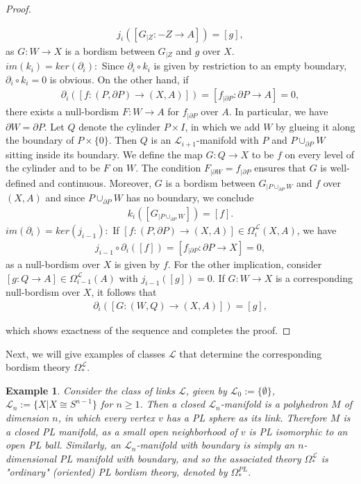 \documentclass[11pt]{book}
\newtheorem{example}{Example}
\begin{document}
\begin{proof}
\begin{itemize}
\begin{align*}
j_i([G_{|Z}: -Z \to A]) = [g],
\end{align*}
as $G: W \to X$ is a bordism between $G_{|Z}$ and $g$ over $X$. \\
$im(k_i)=ker(\partial_i):$ Since $\partial_i \circ k_i$ is given by restriction to an empty boundary, $\partial_i \circ k_i=0$ is obvious. On the other hand, if 
\begin{align*}
\partial_i([f:(P, \partial P) \to (X,A)])= [f_{| \partial P} : \partial P \to A] = 0,
\end{align*}
there exists a null-bordism $F: W \to A$ for $f_{| \partial P}$ over $A$. In particular, we have $\partial W= \partial P$. Let $Q$ denote the cylinder $P \times I$, in which we add $W$ by glueing it along the boundary of $P \times \{ 0 \}$. Then $Q$ is an $\mathcal{L}_{i+1}$-manifold with $P$ and $P \cup_{\partial P} W$ sitting inside its boundary. We define the map $G: Q \to X$ to be $f$ on every level of the cylinder and to be $F$ on $W$. The condition $F_{| \partial W}=f_{| \partial P}$ ensures that $G$ is well-defined and continuous. Moreover, $G$ is a bordism between $G_{|P \cup_{\partial P} W}$ and $f$ over $(X,A)$ and since $P \cup_{\partial P} W$ has no boundary, we conclude 
\begin{align*}
k_i([G_{|P \cup_{\partial P} W}])=[f].
\end{align*}
$im(\partial_i)= ker(j_{i-1}):$ If $[f:(P, \partial P) \to (X,A)] \in \Omega_{i}^{\mathcal{L}}(X,A)$, we have 
\begin{align*}
j_{i-1} \circ \partial_i ([f])= [f_{| \partial P}: \partial P \to X] = 0,
\end{align*}
as a null-bordism over $X$ is given by $f$. For the other implication, consider $[g: Q \to A] \in \Omega_{i-1}^{\mathcal{L}}(A)$ with $j_{i-1}([g])=0$. If $G: W \to X$ is a corresponding null-bordism over $X$, it follows that
\begin{align*}
\partial_i([G: (W,Q) \to (X,A)]) = [g],
\end{align*}
\end{itemize}
which shows exactness of the sequence and completes the proof.
\end{proof}

Next, we will give examples of classes $\mathcal{L}$ that determine the corresponding bordism theory $\Omega_*^{\mathcal{L}}$.

\begin{example}
Consider the class of links $\mathcal{L}$, given by $\mathcal{L}_0 := \{ \emptyset \}$, $\mathcal{L}_n:= \{ X | X \cong S^{n-1} \}$ for $n \geq 1$. Then a closed $\mathcal{L}_n$-manifold is a polyhedron $M$ of dimension $n$, in which every vertex $v$ has a PL sphere as its link. Therefore $M$ is a closed PL manifold, as a small open neighborhood of $v$ is PL isomorphic to an open PL ball. Similarly, an $\mathcal{L}_n$-manifold with boundary is simply an $n$-dimensional PL manifold with boundary, and so the associated theory $\Omega_*^{\mathcal{L}}$ is "ordinary" (oriented) PL bordism theory, denoted by $\Omega_*^{PL}$.
\end{example}
\end{document}
